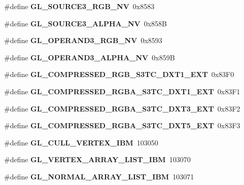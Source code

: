 \begin{DoxyCompactItemize}
\item 
\#define {\bfseries G\+L\+\_\+\+S\+O\+U\+R\+C\+E3\+\_\+\+R\+G\+B\+\_\+\+N\+V}~0x8583\label{_s_d_l__opengl_8h_adcc513d810406b65209ce77edd661613}

\item 
\#define {\bfseries G\+L\+\_\+\+S\+O\+U\+R\+C\+E3\+\_\+\+A\+L\+P\+H\+A\+\_\+\+N\+V}~0x858\+B\label{_s_d_l__opengl_8h_ac0fb9d35219196abb26f406480944817}

\item 
\#define {\bfseries G\+L\+\_\+\+O\+P\+E\+R\+A\+N\+D3\+\_\+\+R\+G\+B\+\_\+\+N\+V}~0x8593\label{_s_d_l__opengl_8h_abb4caf86bf032ebbff38a560f45112d0}

\item 
\#define {\bfseries G\+L\+\_\+\+O\+P\+E\+R\+A\+N\+D3\+\_\+\+A\+L\+P\+H\+A\+\_\+\+N\+V}~0x859\+B\label{_s_d_l__opengl_8h_a052d824f437843d0633da401803121d6}

\item 
\#define {\bfseries G\+L\+\_\+\+C\+O\+M\+P\+R\+E\+S\+S\+E\+D\+\_\+\+R\+G\+B\+\_\+\+S3\+T\+C\+\_\+\+D\+X\+T1\+\_\+\+E\+X\+T}~0x83\+F0\label{_s_d_l__opengl_8h_a76871dbc9ac35424b25ebc707ca11390}

\item 
\#define {\bfseries G\+L\+\_\+\+C\+O\+M\+P\+R\+E\+S\+S\+E\+D\+\_\+\+R\+G\+B\+A\+\_\+\+S3\+T\+C\+\_\+\+D\+X\+T1\+\_\+\+E\+X\+T}~0x83\+F1\label{_s_d_l__opengl_8h_aaeed69f7c55e377901d9ff6d00463efa}

\item 
\#define {\bfseries G\+L\+\_\+\+C\+O\+M\+P\+R\+E\+S\+S\+E\+D\+\_\+\+R\+G\+B\+A\+\_\+\+S3\+T\+C\+\_\+\+D\+X\+T3\+\_\+\+E\+X\+T}~0x83\+F2\label{_s_d_l__opengl_8h_aababc4e27a4845063f8d1b7b91c20b2e}

\item 
\#define {\bfseries G\+L\+\_\+\+C\+O\+M\+P\+R\+E\+S\+S\+E\+D\+\_\+\+R\+G\+B\+A\+\_\+\+S3\+T\+C\+\_\+\+D\+X\+T5\+\_\+\+E\+X\+T}~0x83\+F3\label{_s_d_l__opengl_8h_a5f6e032bc5f877d09491c9a8ed191571}

\item 
\#define {\bfseries G\+L\+\_\+\+C\+U\+L\+L\+\_\+\+V\+E\+R\+T\+E\+X\+\_\+\+I\+B\+M}~103050\label{_s_d_l__opengl_8h_a23dfc5378a832ed1f786a4d0eedb3270}

\item 
\#define {\bfseries G\+L\+\_\+\+V\+E\+R\+T\+E\+X\+\_\+\+A\+R\+R\+A\+Y\+\_\+\+L\+I\+S\+T\+\_\+\+I\+B\+M}~103070\label{_s_d_l__opengl_8h_a1fe27df3f44e58b5055499681c143e78}

\item 
\#define {\bfseries G\+L\+\_\+\+N\+O\+R\+M\+A\+L\+\_\+\+A\+R\+R\+A\+Y\+\_\+\+L\+I\+S\+T\+\_\+\+I\+B\+M}~103071\label{_s_d_l__opengl_8h_a37da9e08b1b313f1d5e89a7b8610da26}


\end{DoxyCompactItemize}
